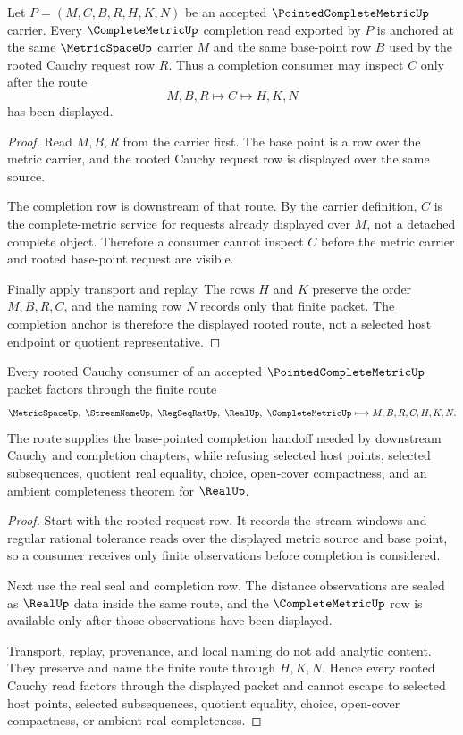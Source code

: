 \begin{theorem}
\label{thm:pointed-complete-metric-completion-anchor}
Let $P=(M,C,B,R,H,K,N)$ be an accepted
$\PointedCompleteMetricUp$ carrier. Every $\CompleteMetricUp$ completion read
exported by $P$ is anchored at the same $\MetricSpaceUp$ carrier $M$ and the
same base-point row $B$ used by the rooted Cauchy request row $R$. Thus a
completion consumer may inspect $C$ only after the route
$$
M,B,R \longmapsto C \longmapsto H,K,N
$$
has been displayed.
\end{theorem}
\begin{proof}
Read $M,B,R$ from the carrier first. The base point is a row over the metric
carrier, and the rooted Cauchy request row is displayed over the same source.

The completion row is downstream of that route. By the carrier definition,
$C$ is the complete-metric service for requests already displayed over $M$,
not a detached complete object. Therefore a consumer cannot inspect $C$ before
the metric carrier and rooted base-point request are visible.

Finally apply transport and replay. The rows $H$ and $K$ preserve the order
$M,B,R,C$, and the naming row $N$ records only that finite packet. The
completion anchor is therefore the displayed rooted route, not a selected host
endpoint or quotient representative.
\end{proof}

\begin{theorem}
\label{thm:pointed-complete-metric-rooted-cauchy-route}
Every rooted Cauchy consumer of an accepted $\PointedCompleteMetricUp$ packet
factors through the finite route
$$
\MetricSpaceUp,\ \StreamNameUp,\ \RegSeqRatUp,\ \RealUp,\ \CompleteMetricUp
\longmapsto M,B,R,C,H,K,N .
$$
The route supplies the base-pointed completion handoff needed by downstream
Cauchy and completion chapters, while refusing selected host points, selected
subsequences, quotient real equality, choice, open-cover compactness, and an
ambient completeness theorem for $\RealUp$.
\end{theorem}
\begin{proof}
Start with the rooted request row. It records the stream windows and regular
rational tolerance reads over the displayed metric source and base point, so a
consumer receives only finite observations before completion is considered.

Next use the real seal and completion row. The distance observations are
sealed as $\RealUp$ data inside the same route, and the
$\CompleteMetricUp$ row is available only after those observations have been
displayed.

Transport, replay, provenance, and local naming do not add analytic content.
They preserve and name the finite route through $H,K,N$. Hence every rooted
Cauchy read factors through the displayed packet and cannot escape to selected
host points, selected subsequences, quotient equality, choice, open-cover
compactness, or ambient real completeness.
\end{proof}

